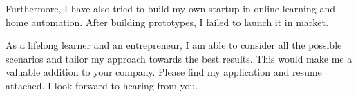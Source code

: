 \documentclass[11pt,a4paper,roman]{moderncv}
\begin{document}
Furthermore, I have also tried to build my own startup in online learning and home automation. After building prototypes, I failed to launch it in market.


As a lifelong learner and an entrepreneur, I am able to consider all the possible scenarios and tailor my approach towards the best results. This would make me a valuable addition to your company. Please find my application and resume attached. 
I look forward to hearing from you.

\vspace{0.5cm}


\makeletterclosing
\end{document}
